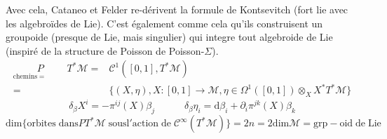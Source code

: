 \documentclass[a4paper,11pt]{article}
\renewcommand{\d}{{\mathrm{d}}}
\newcommand{\e}{{\mathrm{e}}}
\begin{document}
Avec cela, Cataneo et Felder re-dérivent la formule de Kontsevitch (fort lie avec les algebroïdes de Lie). C'est également comme cela qu'ils construisent un groupoide (presque de Lie, mais singulier) qui integre tout algebroide de Lie (inspiré de la structure de Poisson de Poisson-$\Sigma$). 
\begin{align*}\underset{\mathrm{chemins}=\quad\quad\quad}P\!\!\!\!\!\!\!\!\!\!\!\!\!\!\!\!T^*\mathcal{M} =& \mathcal{C}^1([0,1], T^*\mathcal M)\\
=& \{(X,\eta), X:[0,1] \to \mathcal{M}, \eta\in\Omega^1([0,1])\otimes_X X^*T^*\mathcal{M}\}
\end{align*}
$$\delta_\beta X^i = -\pi^{ij}(X)\beta_j\quad\quad\quad \delta_\beta \eta_i = \d \beta_i + \partial_i \pi^{jk}(X) \beta_k$$
$$\mathrm{dim}\{\mathrm{orbites}\;\mathrm{dans} PT^*\mathcal{M}\;\mathrm{sous} \mathrm{l}'\mathrm{action}\;\d\e\;\mathcal{C}^\infty(T^*\mathcal{M})\}=2n=2\mathrm{dim}\mathcal{M}=\mathrm{grp}-\mathrm{oid}\;\d\e\;\mathrm{Lie}$$
\end{document}
